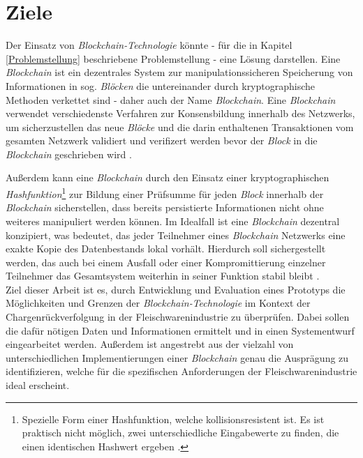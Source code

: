 \section{Ziele}

Der Einsatz von \textit{Blockchain-Technologie} könnte - für die in Kapitel \ref{Problemstellung} beschriebene Problemstellung - eine Lösung darstellen. Eine \textit{Blockchain} ist ein dezentrales System zur manipulationssicheren Speicherung von Informationen in sog. \textit{Blöcken} die untereinander durch kryptographische Methoden verkettet sind - daher auch der Name \textit{Blockchain}. Eine \textit{Blockchain} verwendet verschiedenste Verfahren zur Konsensbildung innerhalb des Netzwerks, um sicherzustellen das neue \textit{Blöcke} und die darin enthaltenen Transaktionen vom gesamten Netzwerk validiert und verifizert werden bevor der \textit{Block} in die \textit{Blockchain} geschrieben wird \citep[siehe auch][]{Nakamoto2009, Buterin2014, Cardano2017, carVertical}.

Außerdem kann eine \textit{Blockchain} durch den Einsatz einer kryptographischen \textit{Hashfunktion}\footnote{Spezielle Form einer Hashfunktion, welche kollisionsresistent ist. Es ist praktisch nicht möglich, zwei unterschiedliche Eingabewerte zu finden, die einen identischen Hashwert ergeben \citep{Menezes1997}.} zur Bildung einer Prüfsumme für jeden \textit{Block} innerhalb der \textit{Blockchain} sicherstellen, dass bereits persistierte Informationen nicht ohne weiteres manipuliert werden können. Im Idealfall ist eine \textit{Blockchain} dezentral konzipiert, was bedeutet, das jeder Teilnehmer eines \textit{Blockchain} Netzwerks eine exakte Kopie des Datenbestands lokal vorhält. Hierdurch soll sichergestellt werden, das auch bei einem Ausfall oder einer Kompromittierung einzelner Teilnehmer das Gesamtsystem weiterhin in seiner Funktion stabil bleibt \citep{Drescher2017, Tribis2018}.\\

Ziel dieser Arbeit ist es, durch Entwicklung und Evaluation eines Prototyps die Möglichkeiten und Grenzen der \textit{Blockchain-Technologie} im Kontext der Chargenrückverfolgung in der Fleischwarenindustrie zu überprüfen. Dabei sollen die dafür nötigen Daten und Informationen ermittelt und in einen Systementwurf eingearbeitet werden. Außerdem ist angestrebt aus der vielzahl von unterschiedlichen Implementierungen einer \textit{Blockchain} genau die Ausprägung zu identifizieren, welche für die spezifischen Anforderungen der Fleischwarenindustrie ideal erscheint.

